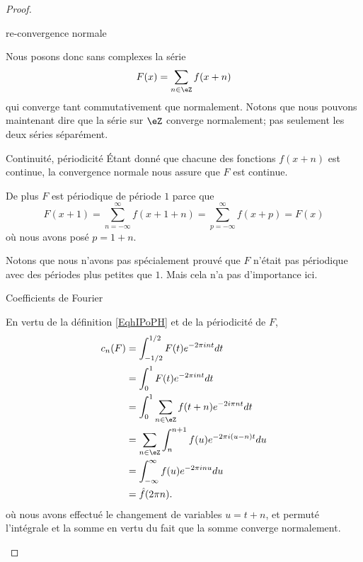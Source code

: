 \begin{proof}
\begin{subproof}
    \item[re-convergence normale]

        Nous posons donc sans complexes la série
        \begin{equation}
            F(x)=\sum_{n\in \eZ}f(x+n)
        \end{equation}
        qui converge tant commutativement que normalement. Notons que nous pouvons maintenant dire que la série sur \( \eZ\) converge normalement; pas seulement les deux séries séparément.

    \item[Continuité, périodicité]
        Étant donné que chacune des fonctions \( f(x+n)\) est continue, la convergence normale nous assure que \( F\) est continue.

        De plus \( F\) est périodique de période \( 1\) parce que
        \begin{equation}
            F(x+1)=\sum_{n=-\infty}^{\infty}f(x+1+n)=\sum_{p=-\infty}^{\infty}f(x+p)=F(x)
        \end{equation}
        où nous avons posé \( p=1+n\).

        Notons que nous n'avons pas spécialement prouvé que \( F\) n'était pas périodique avec des périodes plus petites que \( 1\). Mais cela n'a pas d'importance ici.

    \item[Coefficients de Fourier]

        En vertu de la définition \eqref{EqhIPoPH} et de la périodicité de \( F\),
        \begin{subequations}
            \begin{align}
                c_n(F)&=\int_{-1/2}^{1/2}F(t) e^{-2\pi int}dt\\
                &=\int_0^1F(t) e^{-2\pi int}dt\\
                &=\int_0^1\sum_{n\in \eZ}f(t+n) e^{-2 i\pi nt}dt\\
                &=\sum_{n\in \eZ}\int_n^{n+1}f(u) e^{-2\pi i (u-n)t}du\\
                &=\int_{-\infty}^{\infty}f(u) e^{-2\pi inu}du\\
                &=\hat f(2\pi n).
            \end{align}
        \end{subequations}
        où nous avons effectué le changement de variables \( u=t+n\), et permuté l'intégrale et la somme en vertu du fait que la somme converge normalement.


\end{subproof}
\end{proof}
